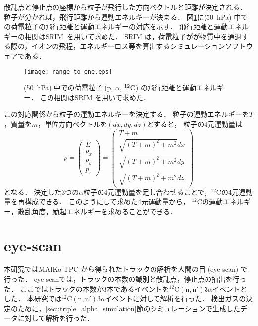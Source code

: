 \documentclass[../master]{subfiles}
\begin{document}
散乱点と停止点の座標から粒子が飛行した方向ベクトルと距離が決定される．
粒子が分かれば，飛行距離から運動エネルギーが決まる．
図\ref{fig::range_to_ene_alpha}に\Methane (\SI{50}{\hecto\pascal}) 中での荷電粒子の飛行距離と運動エネルギーの対応を示す．
飛行距離と運動エネルギーの相関はSRIM~\cite{srim}を用いて求めた．
SRIM は，荷電粒子がが物質中を通過する際の，イオンの飛程，エネルギーロス等を算出するシミュレーションソフトウェアである．
\begin{figure}
  \centering
  \texttt{[image: range\_to\_ene.eps]}
  \caption[\Methane (\SI{50}{\hecto\pascal}) 中での荷電粒子 (p, $\alpha$, ${}^{12}\rm{C}$) の飛行距離と運動エネルギー．]
          {\Methane (\SI{50}{\hecto\pascal}) 中での荷電粒子 (p, $\alpha$, ${}^{12}\rm{C}$) の飛行距離と運動エネルギー．
            この相関はSRIM を用いて求めた．
          }
  \label{fig::range_to_ene_alpha}
\end{figure}
この対応関係から粒子の運動エネルギーを決定する．
粒子の運動エネルギーを$T$，質量を$m$，単位方向ベクトルを$(dx, dy, dz)$とすると，
粒子の4元運動量は
\begin{equation}
  p =
  \begin{pmatrix}
    E \\ p_{x} \\ p_{y} \\ p_{z}
  \end{pmatrix}
  =
  \begin{pmatrix}
    T + m \\ \sqrt{(T+m)^2 + m^2} dx \\ \sqrt{(T+m)^2 + m^2} dy \\ \sqrt{(T+m)^2 + m^2} dz
  \end{pmatrix}
  \label{eq::momentum_vector}
\end{equation}
となる．
決定した3つの$\alpha$粒子の4元運動量を足し合わせることで，${}^{12}\mathrm{C}$の4元運動量を再構成できる．
このようにして求めた4元運動量から，
${}^{12}\mathrm{C}$の運動エネルギー，散乱角度，励起エネルギーを求めることができる．


\section{eye-scan}
本研究ではMAIKo TPC から得られたトラックの解析を人間の目 (eye-scan) で行った．
eye-scanでは，トラックの本数の識別と散乱点，停止点の抽出を行った．
ここではトラックの本数が3本であるイベントを${}^{12}\mathrm{C}(\mathrm{n},\mathrm{n}')3\alpha$イベントとした．
本研究では${}^{12}\mathrm{C}(\mathrm{n},\mathrm{n}')3\alpha$イベントに対して解析を行った．
検出ガスの決定のために，\ref{sec::triple_alpha_simulation}節のシミュレーションで生成したデータに対して解析を行った．
\end{document}
